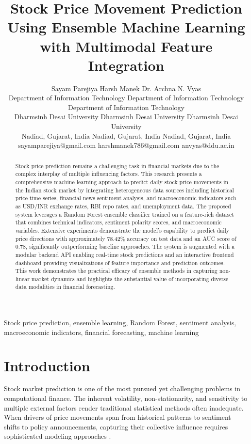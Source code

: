 \documentclass[conference]{IEEEtran}
\title{Stock Price Movement Prediction Using Ensemble Machine Learning with Multimodal Feature Integration}
\author{
Sayam Parejiya \hspace*{1.5cm} Harsh Manek \hspace*{1.5cm} Dr. Archna N. Vyas \\
\normalsize Department of Information Technology \hspace*{0.5cm} Department of Information Technology \hspace*{0.5cm} Department of Information Technology \\
\normalsize Dharmsinh Desai University \hspace*{1.3cm} Dharmsinh Desai University \hspace*{1.3cm} Dharmsinh Desai University \\
\normalsize Nadiad, Gujarat, India \hspace*{1.8cm} Nadiad, Gujarat, India \hspace*{1.8cm} Nadiad, Gujarat, India \\
\normalsize sayamparejiya@gmail.com \hspace*{1.2cm} harshmanek786@gmail.com \hspace*{1.5cm} anvyas@ddu.ac.in
}
\begin{document}
\maketitle

\begin{abstract}
Stock price prediction remains a challenging task in financial markets due to the complex interplay of multiple influencing factors. This research presents a comprehensive machine learning approach to predict daily stock price movements in the Indian stock market by integrating heterogeneous data sources including historical price time series, financial news sentiment analysis, and macroeconomic indicators such as USD/INR exchange rates, RBI repo rates, and unemployment data. The proposed system leverages a Random Forest ensemble classifier trained on a feature-rich dataset that combines technical indicators, sentiment polarity scores, and macroeconomic variables. Extensive experiments demonstrate the model's capability to predict daily price directions with approximately 78.42\% accuracy on test data and an AUC score of 0.78, significantly outperforming baseline approaches. The system is augmented with a modular backend API enabling real-time stock predictions and an interactive frontend dashboard providing visualizations of feature importance and prediction outcomes. This work demonstrates the practical efficacy of ensemble methods in capturing non-linear market dynamics and highlights the substantial value of incorporating diverse data modalities in financial forecasting.
\end{abstract}

\begin{IEEEkeywords}
Stock price prediction, ensemble learning, Random Forest, sentiment analysis, macroeconomic indicators, financial forecasting, machine learning
\end{IEEEkeywords}

\section{Introduction}

Stock market prediction is one of the most pursued yet challenging problems in computational finance. The inherent volatility, non-stationarity, and sensitivity to multiple external factors render traditional statistical methods often inadequate. When drivers of price movements span from historical patterns to sentiment shifts to policy announcements, capturing their collective influence requires sophisticated modeling approaches \cite{patel2015predicting, fischer2018deep}.
\end{document}
